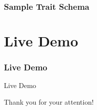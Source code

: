 \documentclass{beamer}
\begin{document}
\begin{frame}
\frametitle{Sample Trait Schema}
\begin{center}
\end{center}
\end{frame}


\section{Live Demo}

\begin{frame}
\frametitle{Live Demo}
\begin{center}
{\fontsize{30}{40}\selectfont Live Demo}
\end{center}
\end{frame}


\begin{frame}
\begin{center}
{\fontsize{30}{40}\selectfont Thank you for your attention!}
\end{center}
\end{frame}

\end{document}
